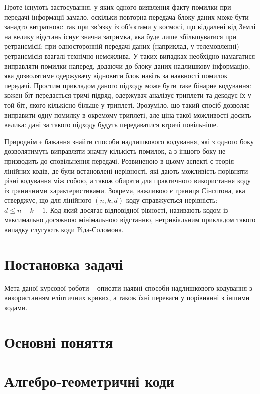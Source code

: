 \documentclass[a4paper,12pt,oneside]{article}
\begin{document}
Проте існують застосування, у яких одного виявлення факту помилки при передачі інформації замало, оскільки повторна передача блоку даних може бути занадто витратною: 
так при зв'язку із об'єктами у космосі, що віддалені від Землі на велику відстань існує значна затримка, яка буде лише збільшуватися при ретрансмісії; 
при односторонній передачі даних (наприклад, у телемовленні) ретрансмісія взагалі технічно неможлива. 
У таких випадках необхідно намагатися виправляти помилки наперед, додаючи до блоку даних надлишкову інформацію, яка дозволятиме одержувачу відновити блок навіть за наявності помилок передачі. 
Простим прикладом даного підходу може бути таке бінарне кодування: кожен біт передається тричі підряд, одержувач аналізує триплети та декодує їх у той біт, якого кількісно більше у триплеті. 
Зрозуміло, що такий спосіб дозволяє виправити одну помилку в окремому триплеті, але ціна такої можливості досить велика: дані за такого підходу будуть передаватися втричі повільніше.

Природнім є бажання знайти способи надлишкового кодування, які з одного боку дозволятимуть виправляти значну кількість помилок, а з іншого боку не призводить до сповільнення передачі. 
Розвиненою в цьому аспекті є теорія лінійних кодів, де були встановлені нерівності, які дають можливість порівняти різні кодування між собою, 
а також обирати для практичного використання коду із граничними характеристиками. 
Зокрема, важливою є границя Сінглтона, яка стверджує, що для лінійного $(n, k, d)$-коду справжується нерівність: $d \le n-k+1$. 
Код який досягає відповідної рівності, називають кодом із максимально досяжною мінімальною відстанню, нетривіальним прикладом такого випадку слугують коди Ріда-Соломона.

\section{Постановка задачі}
Мета даної курсової роботи -- описати наявні способи надлишкового кодування з використанням еліптичних кривих, а також їхні переваги у порівнянні з іншими кодами.

\section{Основні поняття}

\section{Алгебро-геометричні коди}

\nocite{*}

\clearpage
{}

\end{document}
